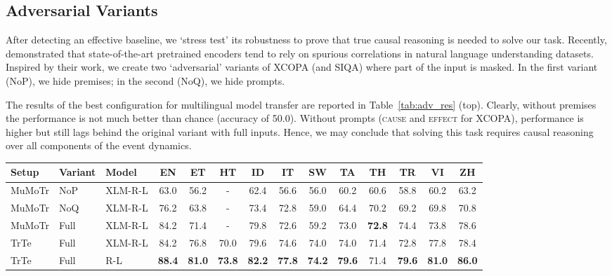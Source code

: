 \documentclass[11pt,a4paper]{article}
\begin{document}
\subsection{Adversarial Variants}
\label{ssec:advvar}
After detecting an effective baseline, we `stress test' its robustness to prove that true causal reasoning is needed to solve our task. Recently, \citet{niven-kao-2019-probing} demonstrated that state-of-the-art pretrained encoders tend to rely on spurious correlations in natural language understanding datasets. Inspired by their work, we create two `adversarial' variants of XCOPA (and SIQA) where part of the input is masked. In the first variant (NoP), we hide premises; in the second (NoQ), we hide prompts. 

The results of the best configuration for multilingual model transfer are reported in Table~\ref{tab:adv_res} (top). Clearly, without premises the performance is not much better than chance (accuracy of 50.0). Without prompts (\textsc{cause} and \textsc{effect} for XCOPA), performance is higher but still lags behind the original variant with full inputs. Hence, we may conclude that solving this task requires causal reasoning over all components of the event dynamics.

\setlength{\tabcolsep}{6.5pt}
\begin{table*}[t]
    \centering
    {\footnotesize
    \begin{tabularx}{\textwidth}{l l l c c c c c c c c c c c}
    \toprule
\textbf{Setup} & \textbf{Variant} & \textbf{Model} & EN & ET & HT & ID & IT & SW & TA & TH & TR & VI & ZH \\ \midrule
MuMoTr & NoP & XLM-R-L & 63.0 & 56.2 & - & 62.4 & 56.6 & 56.0 & 60.2 & 60.6 & 58.8 & 60.2 & 63.2 \\
MuMoTr & NoQ & XLM-R-L & 76.2 & 63.8 & - & 73.4 & 72.8 & 59.0 & 64.4 & 70.2 & 69.2 & 69.8 & 70.8 \\

\hline
MuMoTr & Full & XLM-R-L & 84.2 & 71.4 & - & 79.8 & 72.6 & 59.2 & 73.0 & \textbf{72.8} & 74.4 & 73.8 & 78.6 \\
TrTe & Full & XLM-R-L & 84.2 & 76.8 & 70.0 & 79.6 & 74.6 & 74.0 & 74.0 & 71.4 & 72.8 & 77.8 & 78.4 \\
TrTe & Full & R-L & \textbf{88.4} & \textbf{81.0} & \textbf{73.8} & \textbf{82.2} & \textbf{77.8} & \textbf{74.2} & \textbf{79.6} & 71.4 & \textbf{79.6} & \textbf{81.0} & \textbf{86.0} \\

\bottomrule
    \end{tabularx}
}
    \caption{Detailed per-language XCOPA results of the best cross-lingual transfer setups (bottom). Performance with two adversarial variants of the dataset where premises and prompts are hidden, respectively (top).}
    \label{tab:adv_res}
    \vspace{-1em}
\end{table*} 
\end{document}
